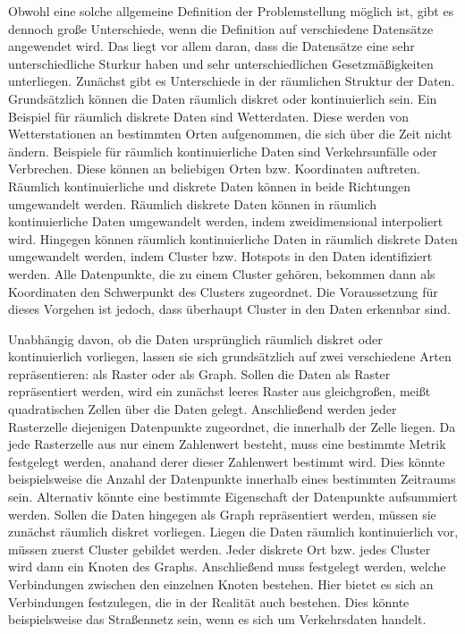 Obwohl eine solche allgemeine Definition der Problemstellung möglich ist, gibt es dennoch große Unterschiede, wenn die Definition auf verschiedene Datensätze angewendet wird.
Das liegt vor allem daran, dass die Datensätze eine sehr unterschiedliche Sturkur haben und sehr unterschiedlichen Gesetzmäßigkeiten unterliegen.
Zunächst gibt es Unterschiede in der räumlichen Struktur der Daten.
Grundsätzlich können die Daten räumlich diskret oder kontinuierlich sein.
Ein Beispiel für räumlich diskrete Daten sind Wetterdaten.
Diese werden von Wetterstationen an bestimmten Orten aufgenommen, die sich über die Zeit nicht ändern.
Beispiele für räumlich kontinuierliche Daten sind Verkehrsunfälle oder Verbrechen.
Diese können an beliebigen Orten bzw. Koordinaten auftreten.
Räumlich kontinuierliche und diskrete Daten können in beide Richtungen umgewandelt werden.
Räumlich diskrete Daten können in räumlich kontinuierliche Daten umgewandelt werden, indem zweidimensional interpoliert wird.
Hingegen können räumlich kontinuierliche Daten in räumlich diskrete Daten umgewandelt werden, indem Cluster bzw. Hotspots in den Daten identifiziert werden.
Alle Datenpunkte, die zu einem Cluster gehören, bekommen dann als Koordinaten den Schwerpunkt des Clusters zugeordnet.
Die Voraussetzung für dieses Vorgehen ist jedoch, dass überhaupt Cluster in den Daten erkennbar sind.

Unabhängig davon, ob die Daten ursprünglich räumlich diskret oder kontinuierlich vorliegen, lassen sie sich grundsätzlich auf zwei verschiedene Arten repräsentieren: als Raster oder als Graph.
Sollen die Daten als Raster repräsentiert werden, wird ein zunächst leeres Raster aus gleichgroßen, meißt quadratischen Zellen über die Daten gelegt.
Anschließend werden jeder Rasterzelle diejenigen Datenpunkte zugeordnet, die innerhalb der Zelle liegen.
Da jede Rasterzelle aus nur einem Zahlenwert besteht, muss eine bestimmte Metrik festgelegt werden, anahand derer dieser Zahlenwert bestimmt wird.
Dies könnte beispielsweise die Anzahl der Datenpunkte innerhalb eines bestimmten Zeitraums sein.
Alternativ könnte eine bestimmte Eigenschaft der Datenpunkte aufsummiert werden.
Sollen die Daten hingegen als Graph repräsentiert werden, müssen sie zunächst räumlich diskret vorliegen.
Liegen die Daten räumlich kontinuierlich vor, müssen zuerst Cluster gebildet werden.
Jeder diskrete Ort bzw. jedes Cluster wird dann ein Knoten des Graphs.
Anschließend muss festgelegt werden, welche Verbindungen zwischen den einzelnen Knoten bestehen.
Hier bietet es sich an Verbindungen festzulegen, die in der Realität auch bestehen.
Dies könnte beispielsweise das Straßennetz sein, wenn es sich um Verkehrsdaten handelt.

